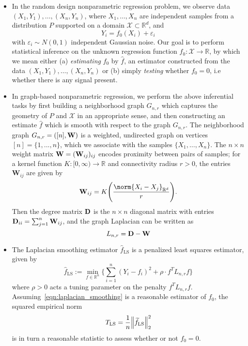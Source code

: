\documentclass{article}
\newcommand{\Reals}{\mathbb{R}}
\newcommand{\1}{\mathbf{1}}
\newcommand{\Rd}{\Reals^d}
\newcommand{\Lap}{L}
\newcommand{\Xset}{\mathcal{X}}
\newcommand{\mc}[1]{\mathcal{#1}}
\newcommand{\wt}[1]{\widetilde{#1}}
\newcommand{\wh}[1]{\widehat{#1}}
\newcommand{\LS}{\mathrm{LS}}
\theoremstyle{alden}
\theoremstyle{aldenthm}
\theoremstyle{definition}
\theoremstyle{remark}
\begin{document}
\begin{itemize}
	\item In the random design nonparametric regression problem, we observe data $(X_1,Y_1),\ldots,(X_n,Y_n)$, where $X_1,\ldots,X_n$ are independent samples from a distribution $P$ supported on a domain $\Xset \subset \Rd$, and 
	\begin{equation}
	\label{eqn:random_design_regression}
	Y_i = f_0(X_i) + \varepsilon_i
	\end{equation}
	with $\varepsilon_i \sim N(0,1)$ independent Gaussian noise. Our goal is to perform statistical inference on the unknown regression function $f_0: \Xset \to \Reals$, by which we mean either (a) \emph{estimating} $f_0$ by $\wh{f}$, an estimator constructed from the data $(X_1,Y_1),\ldots,(X_n,Y_n)$ or (b) simply \emph{testing} whether $f_0 = 0$, i.e whether there is any signal present. 
	\item In graph-based nonparametric regression, we perform the above inferential tasks by first building a neighborhood graph $G_{n,r}$ which captures the geometry of $P$ and $\mc{X}$ in an appropriate sense, and then constructing an estimate $\wh{f}$ which is smooth with respect to the graph $G_{n,r}$. The neighborhood graph $G_{n,r} = ([n],{\bf W})$ is a weighted, undirected graph on vertices $[n] = \{1,...,n\}$, which we associate with the samples $\{X_1,\ldots,X_n\}$. The $n \times n$ weight matrix ${\bf W} = ({\bf W}_{ij})_{ij}$ encodes proximity between pairs of samples; for a kernel function $K: [0,\infty) \to \Reals$ and connectivity radius $r > 0$, the entries $\mathbf{W}_{ij}$ are given by
	\begin{equation*}
	\label{eqn:neighborhood_graph}
	{\bf W}_{ij} = K\Biggl(\frac{\norm{X_i - X_j}_{\Rd}}{r}\Biggr).
	\end{equation*}
	Then the degree matrix ${\bf D}$ is the $n \times n$ diagonal matrix with entries ${\bf D}_{ii} = \sum_{j = 1}^{n}{\bf W}_{ij}$, and the graph Laplacian can be written as
	\begin{equation}
	\label{eqn:graph_Laplacian}
	\Lap_{n,r} = \bf{D} - \bf{W}
	\end{equation}
	\item The Laplacian smoothing estimator $\wh{f}_{\LS}$ \citep{smola2003} is a penalized least squares estimator, given by
	\begin{equation}
	\label{eqn:laplacian_smoothing}
	\wh{f}_{\LS} := \min_{f \in \Reals^n} \biggl\{\sum_{i = 1}^{n}(Y_i - f_i)^2 + \rho \cdot f^T \Lap_{n,r} f \biggr\}
	\end{equation}
	where $\rho > 0$ acts a tuning parameter on the penalty $f^T \Lap_{{n,r}} f$.
	Assuming~\eqref{eqn:laplacian_smoothing} is a reasonable estimator of $f_0$, the squared empirical norm
	\begin{equation}
	T_{\LS} = \frac{1}{n}\Bigl\|\wt{f}_{\LS}\Bigr\|_2^2 \label{eqn:laplacian_smoothing_test}
	\end{equation}
	is in turn a reasonable statistic to assess whether or not $f_0 = 0$. 
\end{itemize}
\end{document}
